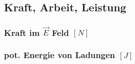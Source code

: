 \subsection{Kraft, Arbeit, Leistung}
    \subsubsection{Kraft im $\vec{E}$ Feld \hfill $[N]$}
    
    \subsubsection{pot. Energie von Ladungen \hfill $[J]$}
    
    \vfill \null \columnbreak

